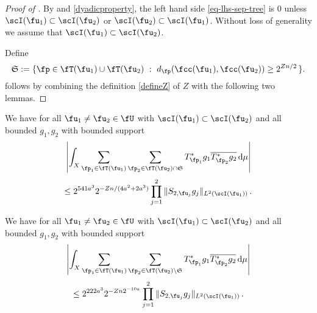 \begin{proof}[Proof of ]
    By  and \eqref{dyadicproperty}, the left hand side \eqref{eq-lhs-sep-tree} is $0$ unless $\scI(\fu_1) \subset \scI(\fu_2)$ or $\scI(\fu_2) \subset \scI(\fu_1)$. Without loss of generality we assume that $\scI(\fu_1) \subset \scI(\fu_2)$.

    Define
    \begin{equation}
        \label{def-Tree-S-set}
         \mathfrak{S} := \{\fp \in \fT(\fu_1) \cup \fT(\fu_2) \ : \ d_{\fp}(\fcc(\fu_1), \fcc(\fu_2)) \ge 2^{Zn/2}\,\}.
    \end{equation}
     follows by combining the definition \eqref{defineZ} of $Z$ with the following two lemmas.
\end{proof}

\begin{lemma}
        \label{correlation-distant-tree-parts}
        \leanok
        We have for all $\fu_1 \ne \fu_2 \in \fU$ with $\scI(\fu_1) \subset \scI(\fu_2)$ and all bounded $g_1, g_2$ with bounded support
      \begin{equation}
            \label{eq-lhs-big-sep-tree}
            \left| \int_X \sum_{\fp_1 \in \fT(\fu_1)} \sum_{\fp_2 \in \fT(\fu_2) \cap \mathfrak{S}} T^*_{\fp_1}g_1 \overline{T^*_{\fp_2}g_2 }\,\mathrm{d}\mu \right|
        \end{equation}
      \begin{equation}
            \label{eq-rhs-big-sep-tree}
            \le 2^{541a^3} 2^{-Zn/(4a^2 + 2a^3)} \prod_{j =1}^2 \| S_{2, \fu_j} g_j\|_{L^2(\scI(\fu_1))}\,.
        \end{equation}
    \end{lemma}
    \begin{lemma}
        \label{correlation-near-tree-parts}
        \leanok
        We have for all $\fu_1 \ne \fu_2 \in \fU$ with $\scI(\fu_1) \subset \scI(\fu_2)$ and all bounded $g_1, g_2$ with bounded support
      \begin{equation}
            \label{eq-lhs-small-sep-tree}
            \left| \int_X \sum_{\fp_1 \in \fT(\fu_1)} \sum_{\fp_2 \in \fT(\fu_2) \setminus \mathfrak{S}} T^*_{\fp_1}g_1 \overline{T^*_{\fp_2}g_2 }\,\mathrm{d}\mu \right|
        \end{equation}
      \begin{equation}
            \label{eq-rhs-small-sep-tree}
            \le 2^{222a^3} 2^{-Zn 2^{-10a}} \prod_{j =1}^2 \| S_{2, \fu_j} g_j\|_{L^2(\scI(\fu_1))}\,.
        \end{equation}
    \end{lemma}

